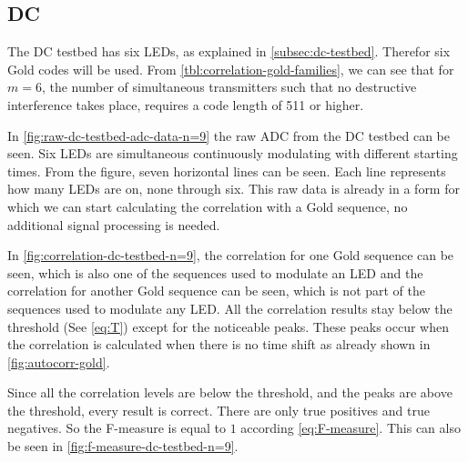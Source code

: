 
\subsection{DC}

The DC testbed has six LEDs, as explained in \autoref{subsec:dc-testbed}.
Therefor six Gold codes will be used.
From \autoref{tbl:correlation-gold-families}, we can see that for $m = 6$, the number of simultaneous transmitters such that no destructive interference takes place, requires a code length of 511 or higher.

In \autoref{fig:raw-dc-testbed-adc-data-n=9} the raw ADC from the DC testbed can be seen.
Six LEDs are simultaneous continuously modulating with different starting times.
From the figure, seven horizontal lines can be seen.
Each line represents how many LEDs are on, none through six.
This raw data is already in a form for which we can start calculating the correlation with a Gold sequence, no additional signal processing is needed.

In \autoref{fig:correlation-dc-testbed-n=9}, the correlation for one Gold sequence can be seen, which is also one of the sequences used to modulate an LED and the correlation for another Gold sequence can be seen, which is not part of the sequences used to modulate any LED.
All the correlation results stay below the threshold (See \autoref{eq:T}) except for the noticeable peaks.
These peaks occur when the correlation is calculated when there is no time shift as already shown in \autoref{fig:autocorr-gold}.

Since all the correlation levels are below the threshold, and the peaks are above the threshold, every result is correct.
There are only true positives and true negatives.
So the F-measure is equal to $1$ according \autoref{eq:F-measure}.
This can also be seen in \autoref{fig:f-measure-dc-testbed-n=9}.


